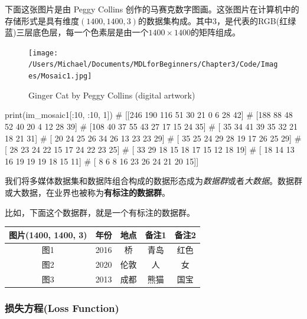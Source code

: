 \documentclass[12pt]{article}
\numberwithin{figure}{section}
\numberwithin{equation}{section}
\begin{document}
\begin{example}
下面这张图片是由 Peggy Collins 创作的马赛克数字图画。这张图片在计算机中的存储形式是具有维度$(1400, 1400, 3)$的数据集构成。其中3，是代表的RGB(红绿蓝)三层底色层，每一个色素层是由一个$1400 \times 1400$的矩阵组成。
\begin{figure}[H]
	\centering
	\texttt{[image: /Users/Michael/Documents/MDLforBeginners/Chapter3/Code/Images/Mosaic1.jpg]}
	\caption{Ginger Cat by Peggy Collins (digital artwork)}
\end{figure}	
\begin{python}
print(im_mosaic1[:10, :10, 1])
# [[246 190 116  51  30  21   0   6  28  42]
#  [188  88  48  52  40  20   4  12  28  39]
#  [108  40  37  55  43  27  17  15  24  35]
#  [ 35  34  41  39  35  32  21  18  21  31]
#  [ 20  24  25  26  34  26  13  23  23  29]
#  [ 35  25  24  29  28  19  17  26  25  29]
#  [ 28  23  24  22  15  17  24  22  23  25]
#  [ 33  29  18  15  18  17  15  12  18  19]
#  [ 18  14  13  16  19  19  19  18  15  11]
#  [  8   6   8  16  23  26  24  21  20  15]]	
\end{python}
\end{example}

\begin{definition}
	我们将多媒体数据集和数据阵组合构成的数据形态成为\textit{数据群}或者\textit{大数据}。数据群或大数据，在业界也被称为\textbf{有标注的数据群}。
\end{definition}

\begin{example}
比如，下面这个数据群，就是一个有标注的数据群。
\begin{table}[H]
	\centering
	\renewcommand{\arraystretch}{1.5}
	\begin{tabular}{ccccc}
	\hline 
		图片(1400, 1400, 3) & 年份 & 地点 & 备注1 & 备注2 \\
		\hline 
		图1 & 2016 & 桥 & 青岛 & 红色 \\
		图2 & 2020 &  伦敦 & 人 & 女 \\
		图3 & 2013 & 成都& 熊猫 & 国宝\\
		\hline 
	\end{tabular}
\end{table}
\end{example}


\subsubsection{损失方程(Loss Function)}
\end{document}
